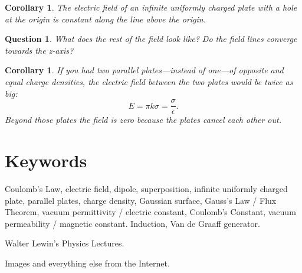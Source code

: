 \documentclass[12pt]{article}
\theoremstyle{plain}
\newtheorem{corollary}[theorem]{Corollary}
\newtheorem{question}[theorem]{Question}
\theoremstyle{definition}
\theoremstyle{remark}
\begin{document}
\begin{corollary}
The electric field of an infinite uniformly charged plate with a hole at the origin is constant along the line above the origin.
\end{corollary}

\begin{question}
What does the rest of the field look like? Do the field lines converge towards the z-axis?
\end{question}

\begin{corollary}
If you had two parallel plates---instead of one---of opposite and equal charge densities, the electric field between the two plates would be twice as big: $$E = \pi k \sigma = \frac{\sigma}{\epsilon}.$$ Beyond those plates the field is zero because the plates cancel each other out.
\end{corollary}

\section*{Keywords}

Coulomb's Law, electric field, dipole, superposition, infinite uniformly charged plate, parallel plates, charge density, Gaussian surface, Gauss's Law / Flux Theorem, vacuum permittivity / electric constant, Coulomb's Constant, vacuum permeability / magnetic constant. Induction, Van de Graaff generator.

\begin{thebibliography}{99}

 Walter Lewin's Physics Lectures.

\bibitem{} Images and everything else from the Internet.

\end{thebibliography}
\end{document}
